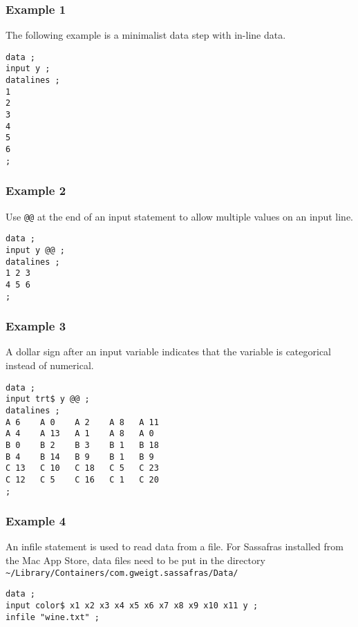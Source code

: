 \documentclass[12pt]{article}
\begin{document}
\subsubsection*{Example 1}

The following example is a minimalist data step with in-line data.

{\footnotesize\begin{verbatim}
data ;
input y ;
datalines ;
1
2
3
4
5
6
;
\end{verbatim}}

\subsubsection*{Example 2}

Use \verb$@@$ at the end of an input statement to allow multiple
values on an input line.

{\footnotesize\begin{verbatim}
data ;
input y @@ ;
datalines ;
1 2 3
4 5 6
;
\end{verbatim}}

\subsubsection*{Example 3}

A dollar sign after an input variable indicates that the variable
is categorical instead of numerical.

{\footnotesize\begin{verbatim}
data ;
input trt$ y @@ ;
datalines ;
A 6    A 0    A 2    A 8   A 11
A 4    A 13   A 1    A 8   A 0
B 0    B 2    B 3    B 1   B 18
B 4    B 14   B 9    B 1   B 9
C 13   C 10   C 18   C 5   C 23
C 12   C 5    C 16   C 1   C 20
;
\end{verbatim}}

\subsubsection*{Example 4}

An infile statement is used to read data from a file.
For Sassafras installed from the Mac App Store,
data files need to be put in the directory
{\footnotesize\verb$~/Library/Containers/com.gweigt.sassafras/Data/$}

{\footnotesize\begin{verbatim}
data ;
input color$ x1 x2 x3 x4 x5 x6 x7 x8 x9 x10 x11 y ;
infile "wine.txt" ;
\end{verbatim}}
\end{document}
